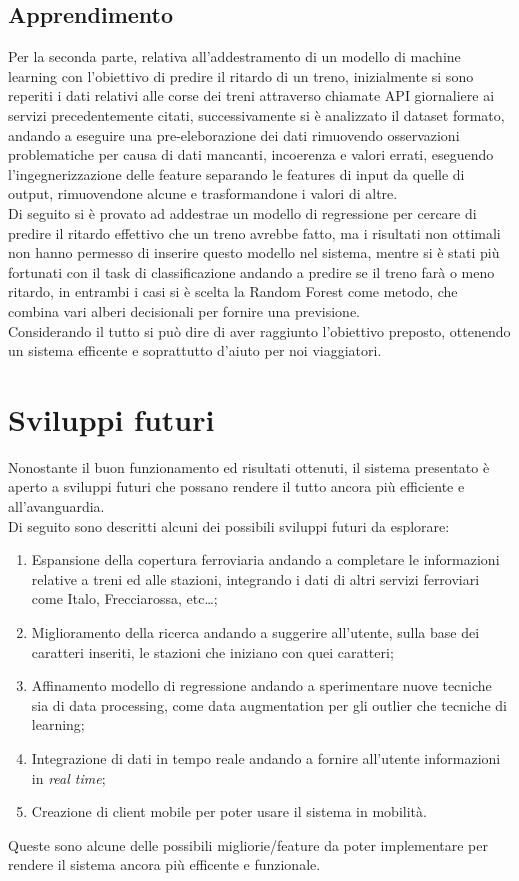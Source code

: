 \documentclass[italian,12pt,a4paper]{article}
\begin{document}
		\subsection{Apprendimento}
			Per la seconda parte, relativa all'addestramento di un modello di machine learning con l'obiettivo di predire il ritardo di un treno, inizialmente si sono reperiti i dati relativi alle corse dei treni attraverso chiamate API giornaliere ai servizi precedentemente citati, successivamente si è analizzato il dataset formato, andando a eseguire una pre-eleborazione dei dati rimuovendo osservazioni problematiche per causa di dati mancanti, incoerenza e valori errati, eseguendo l'ingegnerizzazione delle feature separando le features di input da quelle di output, rimuovendone alcune e trasformandone i valori di altre.\\
			Di seguito si è provato ad addestrae un modello di regressione per cercare di predire il ritardo effettivo che un treno avrebbe fatto, ma i risultati non ottimali non hanno permesso di inserire questo modello nel sistema, mentre si è stati più fortunati con il task di classificazione andando a predire se il treno farà o meno ritardo, in entrambi i casi si è scelta la Random Forest come metodo, che combina vari alberi decisionali per fornire una previsione. \\
			\linebreak
			Considerando il tutto si può dire di aver raggiunto l'obiettivo preposto, ottenendo un sistema efficente e soprattutto d'aiuto per noi viaggiatori.

	
	\section{Sviluppi futuri}
		Nonostante il buon funzionamento ed risultati ottenuti, il sistema presentato è aperto a sviluppi futuri che possano rendere il tutto ancora più efficiente e all'avanguardia. \\
		\linebreak
		Di seguito sono descritti alcuni dei possibili sviluppi futuri da esplorare:
		
		\begin{enumerate}
			\item Espansione della copertura ferroviaria andando a completare le informazioni relative a treni ed alle stazioni, integrando i dati di altri servizi ferroviari come Italo, Frecciarossa, etc\dots;
			\item Miglioramento della ricerca andando a suggerire all'utente, sulla base dei caratteri inseriti, le stazioni che iniziano con quei caratteri;
			\item Affinamento modello di regressione andando a sperimentare nuove tecniche sia di data processing, come data augmentation per gli outlier che tecniche di learning;
			\item Integrazione di dati in tempo reale andando a fornire all'utente informazioni in \textit{real time};
			\item Creazione di client mobile per poter usare il sistema in mobilità.
		\end{enumerate}
		
		Queste sono alcune delle possibili migliorie/feature da poter implementare per rendere il sistema ancora più efficente e funzionale.
		
		\printbibliography
	
\end{document}

